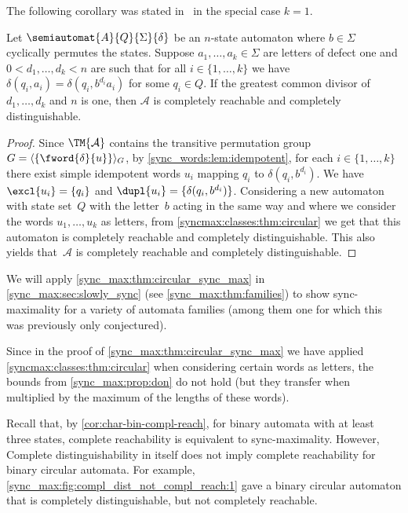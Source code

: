 The following corollary was stated in~\cite[Thm.~13]{HoffmannCircularExtended} in the special case $k = 1$.

\begin{corollary}  \label{sync_max:thm:circular_sync_max} \label{sync_max:cor:circular}
	Let $\semiautomat{A}{Q}{\Sigma}{\delta}$ be an $n$-state automaton where $b \in \Sigma$ cyclically permutes the states.
	Suppose $a_1, \ldots, a_k \in \Sigma$ are letters of defect one
	and $0 < d_1, \ldots, d_k < n$
	are such that for all $i \in \{1,\ldots,k\}$ we have $\delta(q_i, a_i) = \delta(q_i, b^{d_i} a_i)$
	for some $q_i \in Q$.
	If the greatest common divisor of $d_1, \ldots, d_k$ and $n$
	is one, then $\mathcal A$ is completely reachable and completely distinguishable. %
\end{corollary}
\begin{proof}
	Since $\TM{\mathcal A}$ contains the transitive permutation group $G = \langle \{ \fword{\delta}{u} \} \rangle_G$,
	by \cref{sync_words:lem:idempotent}, for each $i \in \{1,\ldots,k\}$
	there exist simple idempotent words $u_i$
	mapping $q_i$ to $\delta(q_i, b^{d_i})$.
	We have $\excl{u_i} = \{q_i\}$
	and $\dupl{u_i} = \{ \delta(q_i, b^{d_i}) \}$.
	Considering a new automaton with state set~$Q$ with the letter~$b$
	acting in the same way and where we consider the words $u_1, \ldots, u_k$ as letters,
	from \cref{syncmax:classes:thm:circular} 
	we get that
	this automaton is completely reachable and completely distinguishable.
	This also yields that~$\mathcal A$ is completely reachable and completely distinguishable.
\end{proof}

We will apply \cref{sync_max:thm:circular_sync_max} 
in \cref{sync_max:sec:slowly_sync} (see \cref{sync_max:thm:families}) to show
sync-maximality for a variety of automata families (among them one for which this was 
previously only conjectured).

Since in the proof of \cref{sync_max:thm:circular_sync_max} we have applied \cref{syncmax:classes:thm:circular} 
when considering certain words as letters, the bounds from \cref{sync_max:prop:don}
do not hold (but they transfer when multiplied by the maximum of the lengths
of these words).

Recall that, by \cref{cor:char-bin-compl-reach}, for binary automata with at least three states,
complete reachability is equivalent to sync-maximality.
However, Complete distinguishability in itself does not imply complete reachability
for binary circular automata. For example, \cref{sync_max:fig:compl_dist_not_compl_reach:1} 
gave a binary circular automaton that is completely distinguishable, but not completely reachable.

